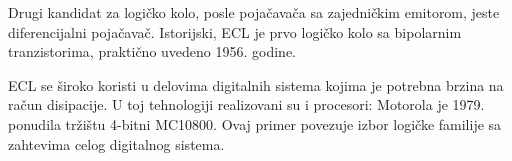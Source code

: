 Drugi kandidat za logičko kolo, posle pojačavača sa zajedničkim emitorom, jeste diferencijalni pojačavač. Istorijski, ECL je prvo logičko kolo sa bipolarnim tranzistorima, praktično uvedeno 1956. godine.

ECL se široko koristi u delovima digitalnih sistema kojima je potrebna brzina na račun disipacije. U toj tehnologiji realizovani su i procesori: Motorola je 1979. ponudila tržištu 4-bitni MC10800. Ovaj primer povezuje izbor logičke familije sa zahtevima celog digitalnog sistema.
